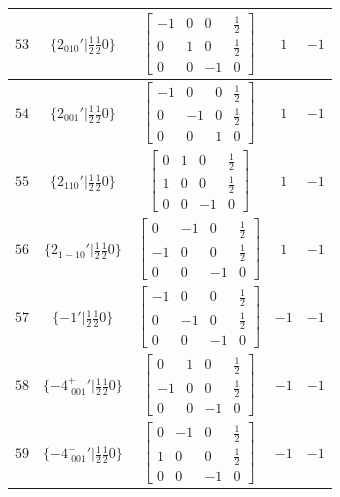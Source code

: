 \documentclass[fleqn,8pt]{jsarticle}
\begin{document}
\begin{longtable}{ccccc}
$ 53 $ & $ \{2{}_{010}{}'|\frac{1}{2} \frac{1}{2} 0\} $ & $ \begin{bmatrix} -1 & 0 & 0 & \frac{1}{2} \\ 0 & 1 & 0 & \frac{1}{2} \\ 0 & 0 & -1 & 0 \end{bmatrix} $ & $ 1 $ & $ -1 $ \\ \hline
$ 54 $ & $ \{2{}_{001}{}'|\frac{1}{2} \frac{1}{2} 0\} $ & $ \begin{bmatrix} -1 & 0 & 0 & \frac{1}{2} \\ 0 & -1 & 0 & \frac{1}{2} \\ 0 & 0 & 1 & 0 \end{bmatrix} $ & $ 1 $ & $ -1 $ \\ \hline
$ 55 $ & $ \{2{}_{110}{}'|\frac{1}{2} \frac{1}{2} 0\} $ & $ \begin{bmatrix} 0 & 1 & 0 & \frac{1}{2} \\ 1 & 0 & 0 & \frac{1}{2} \\ 0 & 0 & -1 & 0 \end{bmatrix} $ & $ 1 $ & $ -1 $ \\ \hline
$ 56 $ & $ \{2{}_{1-10}{}'|\frac{1}{2} \frac{1}{2} 0\} $ & $ \begin{bmatrix} 0 & -1 & 0 & \frac{1}{2} \\ -1 & 0 & 0 & \frac{1}{2} \\ 0 & 0 & -1 & 0 \end{bmatrix} $ & $ 1 $ & $ -1 $ \\ \hline
$ 57 $ & $ \{-1{}'|\frac{1}{2} \frac{1}{2} 0\} $ & $ \begin{bmatrix} -1 & 0 & 0 & \frac{1}{2} \\ 0 & -1 & 0 & \frac{1}{2} \\ 0 & 0 & -1 & 0 \end{bmatrix} $ & $ -1 $ & $ -1 $ \\ \hline
$ 58 $ & $ \{-4^{+}_{\,\,001}{}'|\frac{1}{2} \frac{1}{2} 0\} $ & $ \begin{bmatrix} 0 & 1 & 0 & \frac{1}{2} \\ -1 & 0 & 0 & \frac{1}{2} \\ 0 & 0 & -1 & 0 \end{bmatrix} $ & $ -1 $ & $ -1 $ \\ \hline
$ 59 $ & $ \{-4^{-}_{\,\,001}{}'|\frac{1}{2} \frac{1}{2} 0\} $ & $ \begin{bmatrix} 0 & -1 & 0 & \frac{1}{2} \\ 1 & 0 & 0 & \frac{1}{2} \\ 0 & 0 & -1 & 0 \end{bmatrix} $ & $ -1 $ & $ -1 $ \\ \hline

\end{longtable}
\end{document}

